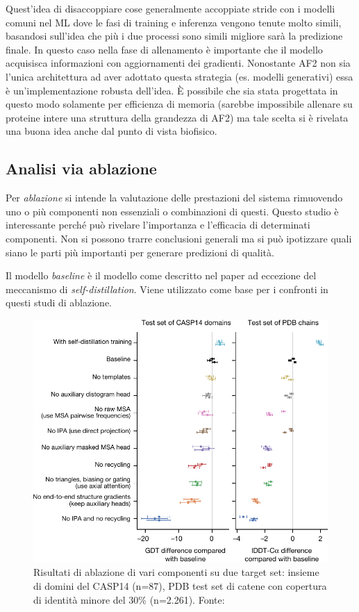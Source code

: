 Quest'idea di disaccoppiare cose generalmente accoppiate stride con i modelli comuni nel ML dove le fasi di training e inferenza vengono tenute molto simili, basandosi sull'idea che più i due processi sono simili migliore sarà la predizione finale. In questo caso nella fase di allenamento è importante che il modello acquisisca informazioni con aggiornamenti dei gradienti. Nonostante AF2 non sia l'unica architettura ad aver adottato questa strategia (es. modelli generativi) essa è un’implementazione robusta dell’idea. È possibile che sia stata progettata in questo modo solamente per efficienza di memoria (sarebbe impossibile allenare su proteine intere una struttura della grandezza di AF2) ma tale scelta si è rivelata una buona idea anche dal punto di vista biofisico.

\subsection{Analisi via ablazione}

Per \textit{ablazione} si intende la valutazione delle prestazioni del sistema rimuovendo uno o più componenti non essenziali o combinazioni di questi. Questo studio è interessante perché può rivelare l'importanza e l'efficacia di determinati componenti. Non si possono trarre conclusioni generali ma si può ipotizzare quali siano le parti più importanti per generare predizioni di qualità.

\par Il modello \textit{baseline} è il modello come descritto nel paper ad eccezione del meccanismo di \textit{self-distillation}. Viene utilizzato come base per i confronti in questi studi di ablazione. 

\begin{figure}[!htb]
	\centering
	\includegraphics[scale=0.6]{images/ablazione.png}
	\caption{Risultati di ablazione di vari componenti su due target set: insieme di domini del CASP14 (n=87), PDB test set di catene con copertura di identità minore del 30\% (n=2.261). Fonte: \cite{jumper2021highly}}
	\label{fig:ablazione1}
\end{figure}

